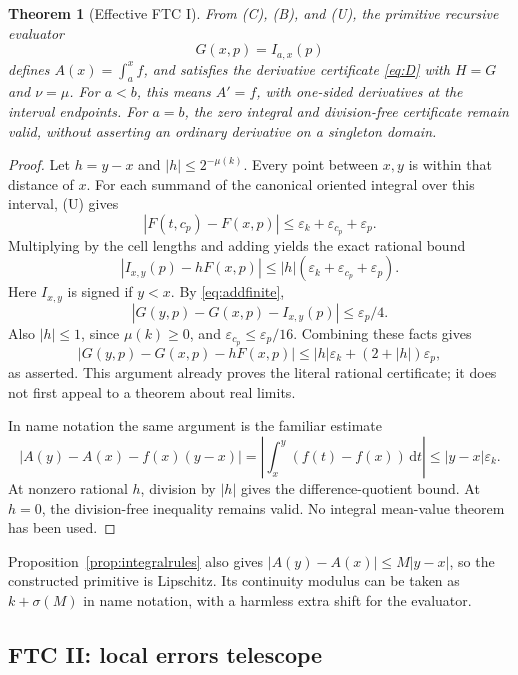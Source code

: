 \documentclass[11pt]{article}
\newtheorem{theorem}{Theorem}[section]
\theoremstyle{definition}
\newcommand{\eps}{\varepsilon}
\newcommand{\abs}[1]{\left|#1\right|}
\newcommand{\dd}{\,\mathrm{d}}
\begin{document}
\begin{theorem}[Effective FTC I]\label{thm:ftc1}
From (C), (B), and (U), the primitive recursive evaluator
\[
 G(x,p)=I_{a,x}(p)
\]
defines \(A(x)=\int_a^x f\), and satisfies the derivative certificate
\eqref{eq:D} with \(H=G\) and \(\nu=\mu\).
For \(a<b\), this means \(A'=f\), with one-sided derivatives at the
interval endpoints.  For \(a=b\), the zero integral and division-free
certificate remain valid, without asserting an ordinary derivative on
a singleton domain.
\end{theorem}
\begin{proof}
Let \(h=y-x\) and \(\abs h\le2^{-\mu(k)}\).  Every point between
\(x,y\) is within that distance of \(x\).  For each summand of the
canonical oriented integral over this interval, (U) gives
\[
 \abs{F(t,c_p)-F(x,p)}\le\eps_k+\eps_{c_p}+\eps_p.
\]
Multiplying by the cell lengths and adding yields the exact rational
bound
\begin{equation}
 \abs{I_{x,y}(p)-hF(x,p)}
 \le\abs h(\eps_k+\eps_{c_p}+\eps_p).\label{eq:localintegral}
\end{equation}
Here \(I_{x,y}\) is signed if \(y<x\).  By
\eqref{eq:addfinite},
\[
 \abs{G(y,p)-G(x,p)-I_{x,y}(p)}\le\eps_p/4.
\]
Also \(\abs h\le1\), since \(\mu(k)\ge0\), and
\(\eps_{c_p}\le\eps_p/16\).  Combining these facts gives
\[
 \abs{G(y,p)-G(x,p)-hF(x,p)}
 \le\abs h\eps_k+(2+\abs h)\eps_p,
\]
as asserted.  This argument already proves the literal rational
certificate; it does not first appeal to a theorem about real limits.

In name notation the same argument is the familiar estimate
\begin{equation}
 \abs{A(y)-A(x)-f(x)(y-x)}
 =\abs{\int_x^y(f(t)-f(x))\dd t}
 \le\abs{y-x}\eps_k.\label{eq:ftc1error}
\end{equation}
At nonzero rational \(h\), division by \(\abs h\) gives the
difference-quotient bound.  At \(h=0\), the division-free inequality
remains valid.  No integral mean-value theorem has been used.
\end{proof}

Proposition~\ref{prop:integralrules} also gives
\(\abs{A(y)-A(x)}\le M\abs{y-x}\), so the constructed primitive is
Lipschitz.  Its continuity modulus can be taken as \(k+\sigma(M)\)
in name notation, with a harmless extra shift for the evaluator.

\subsection{FTC II: local errors telescope}
\end{document}
